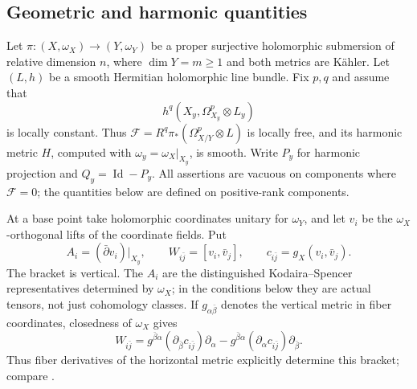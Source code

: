 \documentclass[11pt,reqno]{amsart}
\numberwithin{equation}{section}
\theoremstyle{definition}
\theoremstyle{remark}
\newcommand{\db}{\bar\partial}
\newcommand{\cF}{\mathcal F}
\newcommand{\Id}{\operatorname{Id}}
\begin{document}
\subsection{Geometric and harmonic quantities}
Let $\pi:(X,\omega_X)\to(Y,\omega_Y)$ be a proper surjective holomorphic submersion of relative dimension $n$, where $\dim Y=m\geq1$ and both metrics are K\"ahler. Let $(L,h)$ be a smooth Hermitian holomorphic line bundle. Fix $p,q$ and assume that
\[
 h^q(X_y,\Omega^p_{X_y}\otimes L_y)
\]
is locally constant. Thus $\cF=R^q\pi_*(\Omega^p_{X/Y}\otimes L)$ is locally free, and its harmonic metric $H$, computed with $\omega_y=\omega_X|_{X_y}$, is smooth. Write $P_y$ for harmonic projection and $Q_y=\Id-P_y$. All assertions are vacuous on components where $\cF=0$; the quantities below are defined on positive-rank components.

At a base point take holomorphic coordinates unitary for $\omega_Y$, and let $v_i$ be the $\omega_X$-orthogonal lifts of the coordinate fields. Put
\begin{equation}\label{eq:fibration-geometry}
 A_i=(\db v_i)|_{X_y},\qquad
 W_{i\bar j}=[v_i,\bar v_j],\qquad
 c_{i\bar j}=g_X(v_i,\bar v_j).
\end{equation}
The bracket is vertical. The $A_i$ are the distinguished Kodaira--Spencer representatives determined by $\omega_X$; in the conditions below they are actual tensors, not just cohomology classes. If $g_{\alpha\bar\beta}$ denotes the vertical metric in fiber coordinates, closedness of $\omega_X$ gives
\begin{equation}\label{eq:bracket-gradient}
 W_{i\bar j}
 =g^{\bar\beta\alpha}(\partial_{\bar\beta}c_{i\bar j})\partial_\alpha
  -g^{\bar\beta\alpha}(\partial_\alpha c_{i\bar j})\partial_{\bar\beta}.
\end{equation}
Thus fiber derivatives of the horizontal metric explicitly determine this bracket; compare \cite[Lemma 8.1]{CS24}.
\end{document}
